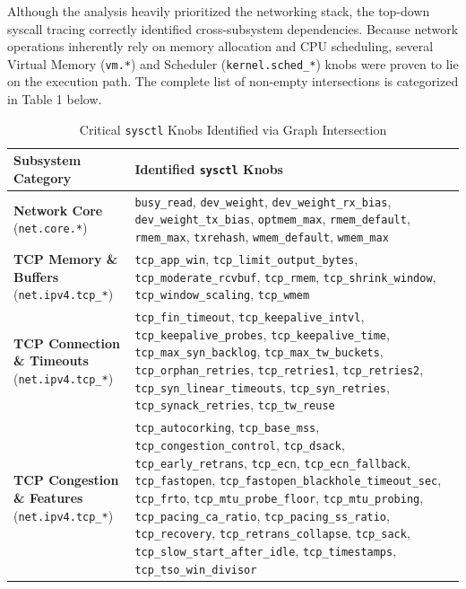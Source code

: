Although the analysis heavily prioritized the networking stack, the top-down syscall tracing correctly identified cross-subsystem dependencies.
Because network operations inherently rely on memory allocation and CPU scheduling, several Virtual Memory (\texttt{vm.*}) and Scheduler (\texttt{kernel.sched\_*}) knobs were proven to lie on the execution path.
The complete list of non-empty intersections is categorized in Table 1 below.

\begin{table}[htbp]
    \centering
    \caption{Critical \texttt{sysctl} Knobs Identified via Graph Intersection}
    \label{tab:critical_knobs}
    \renewcommand{\arraystretch}{1.3} %
    \begin{tabular}{@{} >{\raggedright\arraybackslash}p{4.5cm} >{\raggedright\arraybackslash}p{10cm} @{}}
        \toprule
        \textbf{Subsystem Category} & \textbf{Identified \texttt{sysctl} Knobs} \\
        \midrule
        
        \textbf{Network Core} \newline (\texttt{net.core.*}) & 
        \texttt{busy\_read}, \texttt{dev\_weight}, \texttt{dev\_weight\_rx\_bias}, \texttt{dev\_weight\_tx\_bias}, \texttt{optmem\_max}, \texttt{rmem\_default}, \texttt{rmem\_max}, \texttt{txrehash}, \texttt{wmem\_default}, \texttt{wmem\_max} \\
        
        \textbf{TCP Memory \& Buffers} \newline (\texttt{net.ipv4.tcp\_*}) & 
        \texttt{tcp\_app\_win}, \texttt{tcp\_limit\_output\_bytes}, \texttt{tcp\_moderate\_rcvbuf}, \texttt{tcp\_rmem}, \texttt{tcp\_shrink\_window}, \texttt{tcp\_window\_scaling}, \texttt{tcp\_wmem} \\
        
        \textbf{TCP Connection \& Timeouts} \newline (\texttt{net.ipv4.tcp\_*}) & 
        \texttt{tcp\_fin\_timeout}, \texttt{tcp\_keepalive\_intvl}, \texttt{tcp\_keepalive\_probes}, \texttt{tcp\_keepalive\_time}, \texttt{tcp\_max\_syn\_backlog}, \texttt{tcp\_max\_tw\_buckets}, \texttt{tcp\_orphan\_retries}, \texttt{tcp\_retries1}, \texttt{tcp\_retries2}, \texttt{tcp\_syn\_linear\_timeouts}, \texttt{tcp\_syn\_retries}, \texttt{tcp\_synack\_retries}, \texttt{tcp\_tw\_reuse} \\
        
        \textbf{TCP Congestion \& Features} \newline (\texttt{net.ipv4.tcp\_*}) & 
        \texttt{tcp\_autocorking}, \texttt{tcp\_base\_mss}, \texttt{tcp\_congestion\_control}, \texttt{tcp\_dsack}, \texttt{tcp\_early\_retrans}, \texttt{tcp\_ecn}, \texttt{tcp\_ecn\_fallback}, \texttt{tcp\_fastopen}, \texttt{tcp\_fastopen\_blackhole\_timeout\_sec}, \texttt{tcp\_frto}, \texttt{tcp\_mtu\_probe\_floor}, \texttt{tcp\_mtu\_probing}, \texttt{tcp\_pacing\_ca\_ratio}, \texttt{tcp\_pacing\_ss\_ratio}, \texttt{tcp\_recovery}, \texttt{tcp\_retrans\_collapse}, \texttt{tcp\_sack}, \texttt{tcp\_slow\_start\_after\_idle}, \texttt{tcp\_timestamps}, \texttt{tcp\_tso\_win\_divisor} \\
        

\end{tabular}
\end{table}
